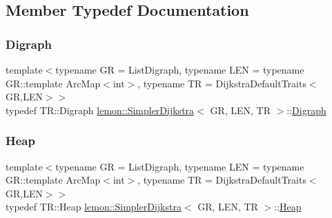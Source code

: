 \subsection{Member Typedef Documentation}
\mbox{\label{classlemon_1_1_simpler_dijkstra_ac19103e2c76d2258f7507dd5921d814d}} 
\subsubsection{\texorpdfstring{Digraph}{Digraph}}
{\footnotesize\ttfamily template$<$typename GR = List\+Digraph, typename L\+EN = typename G\+R\+::template Arc\+Map$<$int$>$, typename TR = Dijkstra\+Default\+Traits$<$\+G\+R,\+L\+E\+N$>$$>$ \\
typedef T\+R\+::\+Digraph \hyperlink{classlemon_1_1_simpler_dijkstra}{lemon\+::\+Simpler\+Dijkstra}$<$ GR, L\+EN, TR $>$\+::\hyperlink{classlemon_1_1_simpler_dijkstra_ac19103e2c76d2258f7507dd5921d814d}{Digraph}}

\mbox{\label{classlemon_1_1_simpler_dijkstra_aafddddfbd1c0c9c054fffa959a2a1a3f}} 
\subsubsection{\texorpdfstring{Heap}{Heap}}
{\footnotesize\ttfamily template$<$typename GR = List\+Digraph, typename L\+EN = typename G\+R\+::template Arc\+Map$<$int$>$, typename TR = Dijkstra\+Default\+Traits$<$\+G\+R,\+L\+E\+N$>$$>$ \\
typedef T\+R\+::\+Heap \hyperlink{classlemon_1_1_simpler_dijkstra}{lemon\+::\+Simpler\+Dijkstra}$<$ GR, L\+EN, TR $>$\+::\hyperlink{classlemon_1_1_simpler_dijkstra_aafddddfbd1c0c9c054fffa959a2a1a3f}{Heap}}

\mbox{\label{classlemon_1_1_simpler_dijkstra_ae4c36812930d6292b4154e26b76ea10f}} 
